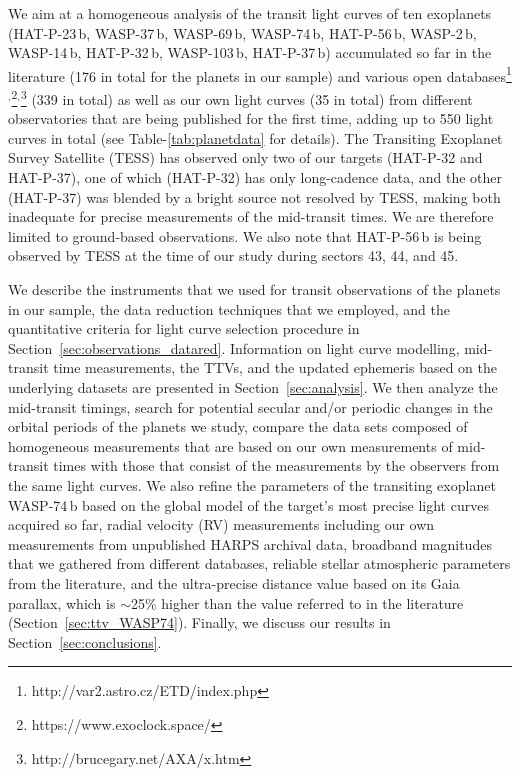 \documentclass[a4paper,fleqn,usenatbib]{mnras}
\begin{document}
We aim at a homogeneous analysis of the transit light curves of ten exoplanets (HAT-P-23\,b, WASP-37\,b, WASP-69\,b, WASP-74\,b, HAT-P-56\,b, WASP-2\,b, WASP-14\,b, HAT-P-32\,b, WASP-103\,b, HAT-P-37\,b) accumulated so far in the literature (176 in total for the planets in our sample) and various open databases\footnote{http://var2.astro.cz/ETD/index.php}$^,$\footnote{https://www.exoclock.space/}$^,$\footnote{http://brucegary.net/AXA/x.htm} (339 in total) as well as our own light curves (35 in total) from different observatories that are being published for the first time, adding up to 550 light curves in total (see Table-\ref{tab:planetdata} for details). The Transiting Exoplanet Survey Satellite (TESS) has observed only two of our targets (HAT-P-32 and HAT-P-37), one of which (HAT-P-32) has only long-cadence data, and the other (HAT-P-37) was blended by a bright source not resolved by TESS, making both inadequate for precise measurements of the mid-transit times. We are therefore limited to ground-based observations. We also note that HAT-P-56\,b is being observed by TESS at the time of our study during sectors 43, 44, and 45.

We describe the instruments that we used for transit observations of the planets in our sample, the data reduction techniques that we employed, and the quantitative criteria for light curve selection procedure in Section~\ref{sec:observations_datared}. Information on light curve modelling, mid-transit time measurements, the TTVs, and the updated ephemeris based on the underlying datasets are presented in Section~\ref{sec:analysis}. We then analyze the mid-transit timings, search for potential secular and/or periodic changes in the orbital periods of the planets we study, compare the data sets composed of homogeneous measurements that are based on our own measurements of mid-transit times with those that consist of the measurements by the observers from the same light curves. We also refine the parameters of the transiting exoplanet WASP-74\,b based on the global model of the target's most precise light curves acquired so far, radial velocity (RV) measurements including our own measurements from unpublished HARPS archival data, broadband magnitudes that we gathered from different databases, reliable stellar atmospheric parameters from the literature, and the ultra-precise distance value based on its Gaia parallax, which is $\sim$25\% higher than the value referred to in the literature (Section~\ref{sec:ttv_WASP74}). Finally, we discuss our results in Section~\ref{sec:conclusions}.
\end{document}
